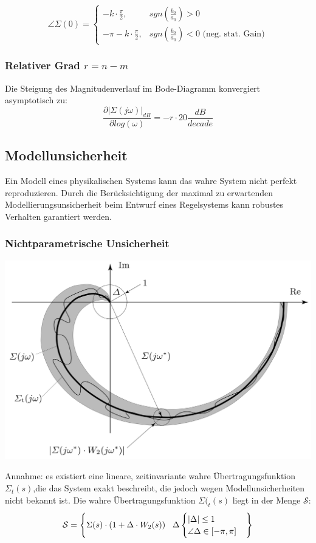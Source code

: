         \[\angle\Sigma(0) =  \begin{cases}
        -k\cdot \frac{\pi}{2}, & sgn(\frac{b_0}{a_0}) > 0 \\
        -\pi-k\cdot \frac{\pi}{2}, & sgn(\frac{b_0}{a_0}) < 0 \textrm{ (neg. stat. Gain)}
        \end{cases}\]
        
        \subsubsection{Relativer Grad $r = n - m$}
        Die Steigung des Magnitudenverlauf im Bode-Diagramm konvergiert asymptotisch zu: 
        \[\frac{\partial|\Sigma(j\omega)|_{dB}}{\partial log(\omega)} = -r\cdot 20\frac{dB}{decade}\]
        
        \subsection{Modellunsicherheit}
            Ein Modell eines physikalischen Systems kann das wahre System nicht perfekt reproduzieren. Durch die Berücksichtigung der maximal zu erwartenden Modellierungsunsicherheit beim Entwurf eines Regelsystems kann robustes Verhalten garantiert werden.
            \subsubsection{Nichtparametrische Unsicherheit}
            \begin{center}
                \includegraphics[width = 0.6\linewidth]{images/05/nichtparametrisierte_Unsicherheit.jpg}
            \end{center}
                Annahme: es existiert eine lineare, zeitinvariante wahre Übertragungsfunktion $\Sigma_t(s)$,die das System exakt beschreibt, die jedoch wegen Modellunsicherheiten nicht bekannt ist. Die wahre Übertragungsfunktion $\Sigma(_t(s)$ liegt in der Menge $\mathcal{S}$:
                \[
                \mathcal{S} = \left\{\Sigma(s) \cdot(1+\Delta\cdot W_2(s)) \hspace{3mm} \Delta\begin{cases}  |\Delta| \leq 1\\ \angle \Delta \in[-\pi,\pi]\end{cases}\right\}
                \]
            
